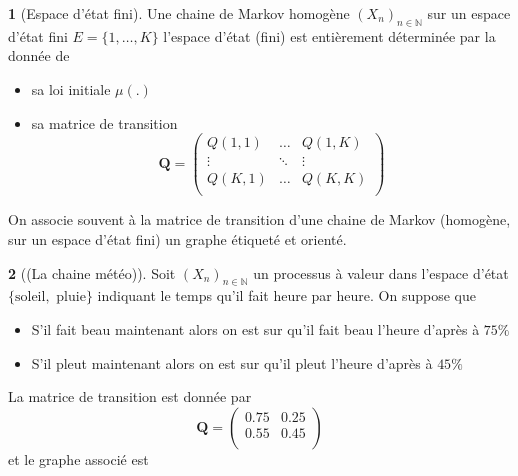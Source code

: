 \documentclass[8pt,notheorems]{beamer}
\theoremstyle{definition}
\theoremstyle{example}
\newtheorem{example}{\translate{Exemple}}
\theoremstyle{mystyle}
\theoremstyle{plain}
\begin{document}
\begin{frame}[allowframebreaks]
\begin{example}[Espace d'état fini]
Une chaine de Markov homogène $(X_n)_{n\in\mathbb{N}}$ sur un espace d'état fini $E=\{1,\ldots,K\}$ l'espace d'état (fini) est entièrement déterminée par la donnée de
\begin{itemize}
\item sa loi initiale $\mu(.)$
\item sa matrice de transition
$$
\mathbf{Q}=\left(\begin{array}{ccc}
Q(1,1)&\ldots&Q(1,K)\\
\vdots&\ddots&\vdots\\
Q(K,1)&\ldots&Q(K,K)\\
\end{array}
\right)
$$
\end{itemize}
\end{example}
On associe souvent à la matrice de transition d'une chaine de Markov (homogène, sur un espace d'état fini) un graphe étiqueté et orienté.
 \end{frame}
 \begin{frame}[allowframebreaks]
\begin{example}[(La chaine météo)]
Soit $(X_n)_{n\in\mathbb{N}}$ un processus à valeur dans l'espace d'état $\{\text{soleil},\text{ pluie}\}$ indiquant le temps qu'il fait heure par heure. On suppose que
\begin{itemize}
\item S'il fait beau maintenant alors on est sur qu'il fait beau l'heure d'après à $75\%$
\item S'il pleut maintenant alors on est sur qu'il pleut l'heure d'après à $45\%$
\end{itemize}
La matrice de transition est donnée par
$$
\mathbf{Q}=\left(\begin{array}{cc}
0.75&0.25\\
0.55&0.45\\
\end{array}
\right)
$$
et le graphe associé est
 \begin{center}
\end{center}
\end{example}
\end{frame}
\end{document}

